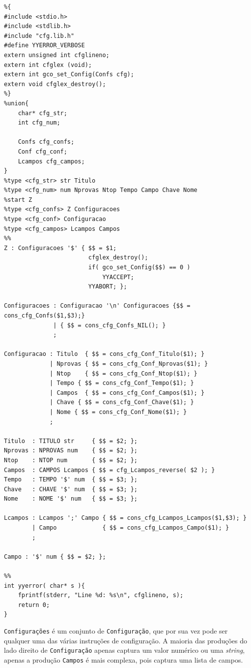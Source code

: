 \documentclass[11pt, a4paper, oneside]{article}
\begin{document}
\begin{lstlisting}[language={}, caption={Yacc do módulo de configurações.}]
%token TITULO NPROVAS NTOP CAMPOS TEMPO CHAVE NOME str num
%{
#include <stdio.h>
#include <stdlib.h>
#include "cfg.lib.h"
#define YYERROR_VERBOSE
extern unsigned int cfglineno;
extern int cfglex (void);
extern int gco_set_Config(Confs cfg);
extern void cfglex_destroy();
%}
%union{
    char* cfg_str;
    int cfg_num;
    
    Confs cfg_confs;
    Conf cfg_conf;
    Lcampos cfg_campos;
}
%type <cfg_str> str Titulo
%type <cfg_num> num Nprovas Ntop Tempo Campo Chave Nome
%start Z
%type <cfg_confs> Z Configuracoes
%type <cfg_conf> Configuracao
%type <cfg_campos> Lcampos Campos
%%
Z : Configuracoes '$' { $$ = $1;
                        cfglex_destroy();
                        if( gco_set_Config($$) == 0 )
                            YYACCEPT;
                        YYABORT; };

Configuracoes : Configuracao '\n' Configuracoes {$$ = cons_cfg_Confs($1,$3);}
              | { $$ = cons_cfg_Confs_NIL(); }
              ;

Configuracao : Titulo  { $$ = cons_cfg_Conf_Titulo($1); }
             | Nprovas { $$ = cons_cfg_Conf_Nprovas($1); }
             | Ntop    { $$ = cons_cfg_Conf_Ntop($1); }
             | Tempo { $$ = cons_cfg_Conf_Tempo($1); }
             | Campos  { $$ = cons_cfg_Conf_Campos($1); }
             | Chave { $$ = cons_cfg_Conf_Chave($1); }
             | Nome { $$ = cons_cfg_Conf_Nome($1); }
             ;

Titulo  : TITULO str     { $$ = $2; };
Nprovas : NPROVAS num    { $$ = $2; };
Ntop    : NTOP num       { $$ = $2; };
Campos  : CAMPOS Lcampos { $$ = cfg_Lcampos_reverse( $2 ); }
Tempo   : TEMPO '$' num  { $$ = $3; };
Chave   : CHAVE '$' num  { $$ = $3; };
Nome    : NOME '$' num   { $$ = $3; };

Lcampos : Lcampos ';' Campo { $$ = cons_cfg_Lcampos_Lcampos($1,$3); }
        | Campo             { $$ = cons_cfg_Lcampos_Campo($1); }
        ;

Campo : '$' num { $$ = $2; };

%%
int yyerror( char* s ){
    fprintf(stderr, "Line %d: %s\n", cfglineno, s);
    return 0;
}
\end{lstlisting} 

\texttt{Configurações} é um conjunto de \texttt{Configuração}, que por sua vez pode ser qualquer uma das várias instruções de configuração. A maioria das produções do lado direito de \texttt{Configuração} apenas captura um valor numérico ou uma \textit{string}, apenas a produção \texttt{Campos} é mais complexa, pois captura uma lista de campos.
\end{document}
